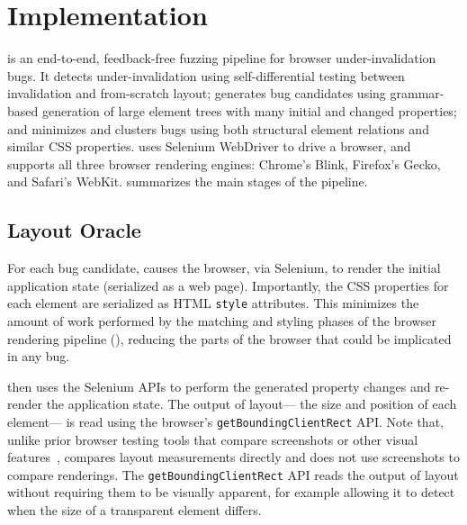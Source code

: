 \section{Implementation}

\toolname is an end-to-end, feedback-free fuzzing pipeline
  for browser under-invalidation bugs.
It detects under-invalidation using self-differential testing
  between invalidation and from-scratch layout;
  generates bug candidates using grammar-based generation
  of large element trees with many initial and changed properties;
  and minimizes and clusters bugs using
  both structural element relations and similar CSS properties.
\toolname uses Selenium WebDriver to drive a browser,
  and supports all three browser rendering engines:
  Chrome's Blink, Firefox's Gecko, and Safari's WebKit.
 summarizes
  the main stages of the \toolname pipeline.



\subsection{Layout Oracle}

For each bug candidate,
  \toolname causes the browser, via Selenium,
  to render the initial application state (serialized as a web page).
Importantly, the CSS properties for each element
  are serialized as HTML \texttt{style} attributes.
This minimizes the amount of work
  performed by the matching and styling phases
  of the browser rendering pipeline (),
  reducing the parts of the browser
  that could be implicated in any bug.

\toolname then uses the Selenium APIs
  to perform the generated property changes
  and re-render the application state.
The output of layout---%
  the size and position of each element---%
  is read using the browser's \texttt{getBoundingClientRect} API.
Note that, unlike prior browser testing tools that compare screenshots
or other visual features~\cite{grewal2025xbi,watanabe2023layout},
\toolname compares layout measurements directly and does not use
screenshots to compare renderings.
The \texttt{getBoundingClientRect} API reads
  the output of layout without requiring them to be visually apparent,
  for example allowing it to detect when
  the size of a transparent element differs.

